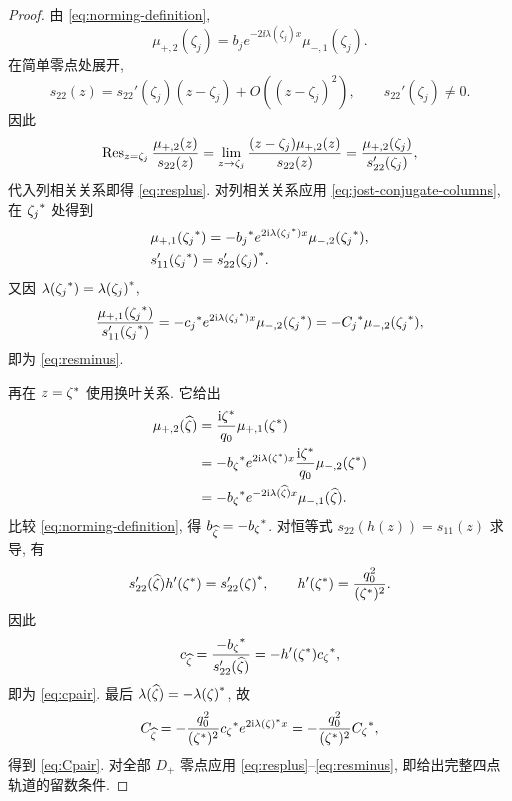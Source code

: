 \begin{proof}
由 \eqref{eq:norming-definition},
\begin{equation*}
\mu_{+,2}(\zeta_j)=b_je^{-2\ii\lambda(\zeta_j)x}\mu_{-,1}(\zeta_j).
\end{equation*}
在简单零点处展开,
\begin{equation*}
s_{22}(z)=s_{22}'(\zeta_j)(z-\zeta_j)+O((z-\zeta_j)^2),\qquad
s_{22}'(\zeta_j)\ne0.
\end{equation*}
因此
\begin{equation*}
\operatorname{Res}_{z=\zeta_j}\dfrac{\mu_{+,2}(z)}{s_{22}(z)}
=\lim\limits_{z\to\zeta_j}\dfrac{(z-\zeta_j)\mu_{+,2}(z)}{s_{22}(z)}
=\dfrac{\mu_{+,2}(\zeta_j)}{s_{22}'(\zeta_j)},
\end{equation*}
代入列相关关系即得 \eqref{eq:resplus}. 对列相关关系应用 \eqref{eq:jost-conjugate-columns}, 在 ${\zeta_j}^{*}$ 处得到
\begin{equation*}
\begin{aligned}
&\mu_{+,1}({\zeta_j}^{*})
=-{b_j}^{*}e^{2\mathrm{i}\lambda({\zeta_j}^{*})x}\mu_{-,2}({\zeta_j}^{*}),\\
&s_{11}'({\zeta_j}^{*})={s_{22}'(\zeta_j)}^{*}.
\end{aligned}
\end{equation*}
又因 $\lambda({\zeta_j}^{*})={\lambda(\zeta_j)}^{*}$,
\begin{equation*}
\dfrac{\mu_{+,1}({\zeta_j}^{*})}{s_{11}'({\zeta_j}^{*})}
=-{c_j}^{*}e^{2\mathrm{i}\lambda({\zeta_j}^{*})x}
\mu_{-,2}({\zeta_j}^{*})
=-{C_j}^{*}\mu_{-,2}({\zeta_j}^{*}),
\end{equation*}
即为 \eqref{eq:resminus}.

再在 $z={\zeta}^{*}$ 使用换叶关系. 它给出
\begin{equation*}
\begin{aligned}
\mu_{+,2}(\widehat\zeta)
&=\dfrac{\mathrm{i}{\zeta}^{*}}{q_0}\mu_{+,1}({\zeta}^{*})\\
&=-{b_\zeta}^{*}e^{2\mathrm{i}\lambda({\zeta}^{*})x}
\dfrac{\mathrm{i}{\zeta}^{*}}{q_0}\mu_{-,2}({\zeta}^{*})\\
&=-{b_\zeta}^{*}e^{-2\mathrm{i}\lambda(\widehat\zeta)x}\mu_{-,1}(\widehat\zeta).
\end{aligned}
\end{equation*}
比较 \eqref{eq:norming-definition}, 得 $b_{\widehat\zeta}=-{b_\zeta}^{*}$.
对恒等式 $s_{22}(h(z))=s_{11}(z)$ 求导, 有
\begin{equation*}
s_{22}'(\widehat\zeta)h'({\zeta}^{*})={s_{22}'(\zeta)}^{*},\qquad
h'({\zeta}^{*})=\dfrac{q_0^2}{({\zeta}^{*})^2}.
\end{equation*}
因此
\begin{equation*}
c_{\widehat\zeta}
=\dfrac{-{b_\zeta}^{*}}{s_{22}'(\widehat\zeta)}
=-h'({\zeta}^{*}){c_\zeta}^{*},
\end{equation*}
即为 \eqref{eq:cpair}. 最后 $\lambda(\widehat\zeta)=-{\lambda(\zeta)}^{*}$, 故
\begin{equation*}
C_{\widehat\zeta}
=-\dfrac{q_0^2}{({\zeta}^{*})^2}{c_\zeta}^{*}
e^{2\mathrm{i}{\lambda(\zeta)}^{*}x}
=-\dfrac{q_0^2}{({\zeta}^{*})^2}{C_\zeta}^{*},
\end{equation*}
得到 \eqref{eq:Cpair}. 对全部 $D_+$ 零点应用 \eqref{eq:resplus}--\eqref{eq:resminus}, 即给出完整四点轨道的留数条件.
\end{proof}
